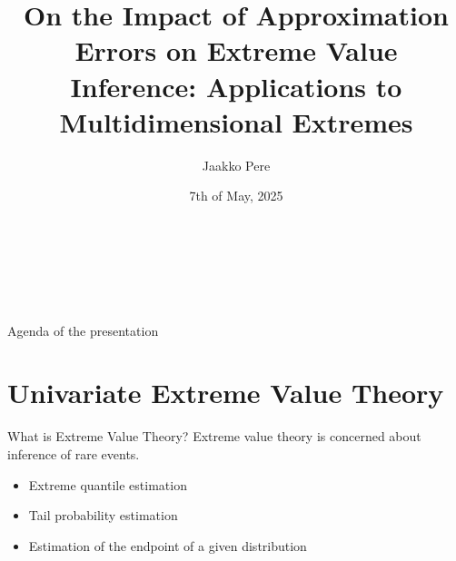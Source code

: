 \documentclass[11pt, aspectratio=169]{beamer}
\author[Jaakko Pere]{Jaakko Pere}
\title{On the Impact of Approximation Errors on Extreme Value Inference:
Applications to Multidimensional Extremes}
\date{7th of May, 2025}
\institute{Dep.\ of Mathematics and Statistics, University of Helsinki}
\begin{document}
{
  \begin{frame}
    \vspace{2.5cm}
    \begin{center}
      \textcolor{hyblue}{\bf\MakeUppercase{\Large\inserttitle}} \\
      {\large\insertauthor} \\
      {\large\insertdate} \\
      {\large\insertinstitute}
    \end{center}
  \end{frame}
}

\begin{frame}{Agenda of the presentation}
  \tableofcontents
\end{frame}

\section{Univariate Extreme Value Theory}


\begin{frame}{What is Extreme Value Theory?}
  Extreme value theory is concerned about inference of rare events.
  \pause
  \vspace{\baselineskip}
  \begin{itemize}
    \item Extreme quantile estimation
    \item Tail probability estimation
    \item Estimation of the endpoint of a given distribution
  \end{itemize}
\end{frame}

\end{document}
